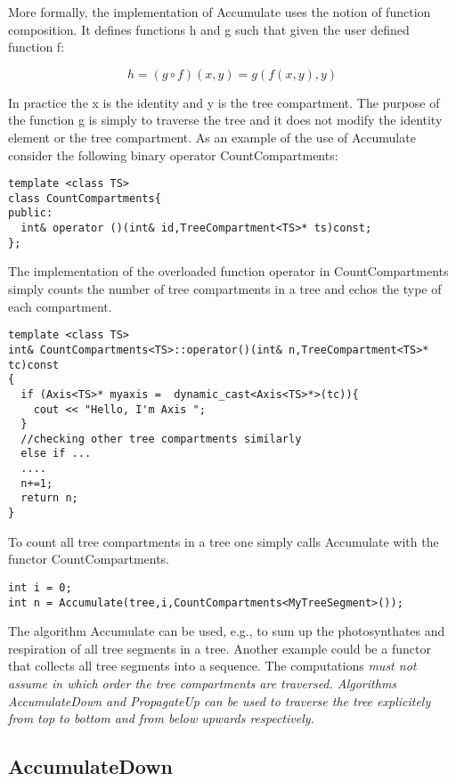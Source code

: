 More formally, the implementation of Accumulate uses the notion of
function composition. It defines functions h and g such that given the
user defined function f:

\begin{displaymath}
h = (g \circ f)(x,y) =  g(f(x,y),y)
\end{displaymath}

In practice the x is the  identity and y  is the tree compartment. The
purpose of the function g  is simply to  traverse the tree and it does
not modify the identity element or the tree compartment. As an example
of   the use  of  Accumulate  consider  the  following binary operator
CountCompartments:

\begin{verbatim}
template <class TS>
class CountCompartments{
public:
  int& operator ()(int& id,TreeCompartment<TS>* ts)const;
};
\end{verbatim}

The  implementation   of   the  overloaded   function     operator  in
CountCompartments simply  counts the number of  tree compartments in a
tree and echos the type of each compartment.

\begin{verbatim}
template <class TS>
int& CountCompartments<TS>::operator()(int& n,TreeCompartment<TS>* tc)const
{
  if (Axis<TS>* myaxis =  dynamic_cast<Axis<TS>*>(tc)){
    cout << "Hello, I'm Axis ";
  }
  //checking other tree compartments similarly
  else if ...  
  ....
  n+=1;
  return n;
}
\end{verbatim}

To count all tree compartments in a tree one simply calls Accumulate
with the functor CountCompartments.

\begin{verbatim}
int i = 0;
int n = Accumulate(tree,i,CountCompartments<MyTreeSegment>());
\end{verbatim}

The  algorithm   Accumulate  can  be   used,  e.g.,  to  sum   up  the
photosynthates and respiration of all tree segments in a tree. Another
example  could be a  functor that  collects all  tree segments  into a
sequence.  The computations \it must not assume \rm in which order the
tree  compartments  are   traversed.   Algorithms  AccumulateDown  and
PropagateUp can be  used to traverse the tree  explicitely from top to
bottom and from below upwards respectively.

\subsection{AccumulateDown}

